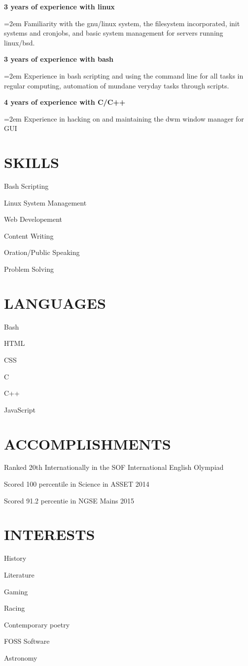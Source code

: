 \documentclass[paper=a4,fontsize=11pt]{scrartcl} %
\newlength{\spacebox}
\newcommand{\sepspace}{\vspace*{1em}}		%
\newcommand{\NewPart}[1]{\section*{\uppercase{#1}}}
\newcommand{\PersonalEntry}[2]{
		\noindent\hangindent=2em\hangafter=0 %
		\parbox{\spacebox}{        %
		\textit{#1}}		       %
		\hspace{1.5em} #2 \par}    %
\newcommand{\SkillsEntry}[1]{      %
		\noindent #1 \par}    %
\newcommand{\EducationEntry}[4]{
		\noindent \textbf{#1} \hfill      %
		\colorbox{Black}{%
			\parbox{6em}{%
			\hfill\color{White}#2}} \par  %
		\noindent \textit{#3} \par        %
		\noindent \hangindent=2em\hangafter=0 \small #4 %
		\normalsize \par}
\newcommand{\WorkEntry}[2]{				  %
		\noindent \textbf{#1} \hfill   \par   %
		\noindent \hangindent=2em\hangafter=0 \small #2 %
		\normalsize \par}
\begin{document}
\WorkEntry{3 years of experience with linux }{Familiarity with the gnu/linux system, the filesystem incorporated, init systems and cronjobs, and basic system management for servers running linux/bsd.}
\sepspace

\WorkEntry{3 years of experience with bash }{Experience in bash scripting and using the command line for all tasks in regular computing, automation of mundane veryday tasks through scripts.}
\sepspace

\WorkEntry{4 years of experience with C/C++ }{Experience in hacking on and maintaining the dwm window manager for GUI}

\NewPart{Skills}{}

\SkillsEntry{Bash Scripting}
\SkillsEntry{Linux System Management}
\SkillsEntry{Web Developement}
\SkillsEntry{Content Writing}
\SkillsEntry{Oration/Public Speaking}
\SkillsEntry{Problem Solving}



\NewPart{Languages}{}
\SkillsEntry{Bash}
\SkillsEntry{HTML}
\SkillsEntry{CSS}
\SkillsEntry{C}
\SkillsEntry{C++}
\SkillsEntry{JavaScript}

\NewPart{Accomplishments}{}
\SkillsEntry{Ranked 20th Internationally in the SOF International English Olympiad}
\SkillsEntry{Scored 100 percentile in Science in ASSET 2014}
\SkillsEntry{Scored 91.2 percentie in NGSE Mains 2015}

\NewPart{Interests}{}
\SkillsEntry{History}
\SkillsEntry{Literature}
\SkillsEntry{Gaming}
\SkillsEntry{Racing}
\SkillsEntry{Contemporary poetry}
\SkillsEntry{FOSS Software}
\SkillsEntry{Astronomy}
  
\end{document}
